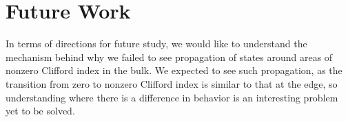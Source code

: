 \documentclass[a4paper]{article}
\begin{document}
\section{Future Work} \label{sec:fut}

In terms of directions for future study, we would like to understand the mechanism behind why we failed to see propagation of states around areas of nonzero Clifford index in the bulk. We expected to see such propagation, as the transition from zero to nonzero Clifford index is similar to that at the edge, so understanding where there is a difference in behavior is an interesting problem yet to be solved.

\printbibliography
\end{document}
